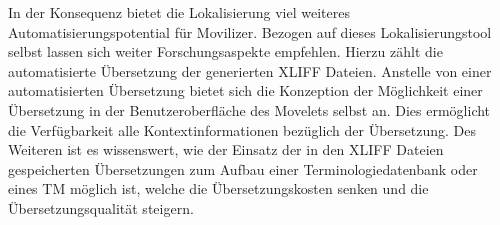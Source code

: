 In der Konsequenz bietet die Lokalisierung viel weiteres Automatisierungspotential für Movilizer. Bezogen auf dieses Lokalisierungstool selbst lassen sich weiter Forschungsaspekte empfehlen. Hierzu zählt die automatisierte Übersetzung der generierten \ac{XLIFF} Dateien. Anstelle von einer automatisierten Übersetzung bietet sich die Konzeption der Möglichkeit einer Übersetzung in der Benutzeroberfläche des Movelets selbst an. Dies ermöglicht die Verfügbarkeit alle Kontextinformationen bezüglich der Übersetzung. Des Weiteren ist es wissenswert, wie der Einsatz der in den \ac{XLIFF} Dateien gespeicherten Übersetzungen zum Aufbau einer Terminologiedatenbank oder eines \ac{TM} möglich ist, welche die Übersetzungskosten senken und die Übersetzungsqualität steigern.